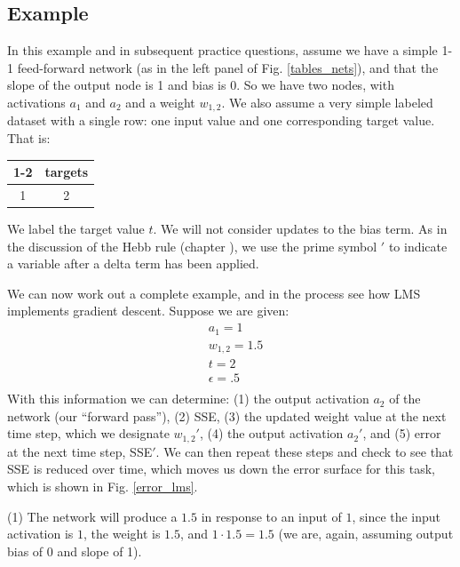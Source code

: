 

\subsection{Example}\label{lms_example}

In this example and in subsequent practice questions, assume we have a  simple 1-1 feed-forward network  (as in the left panel of Fig. \ref{tables_nets}), and that the slope of the output node is 1 and bias is 0. So we have two nodes, with activations $a_1$ and $a_2$ and a weight $w_{1,2}$. We also assume a very simple labeled dataset with a single row: one input value and one corresponding target value. That is:
\begin{center}
\begin{tabular}{| c || c | }
\cline{1-2}
\multicolumn{1}{| c || }{inputs}
 & \multicolumn{1}{c|}{targets} \\
\hline
  1 & 2  \\
\hline
\end{tabular}
\end{center}
We label the target value $t$. We will not consider updates to the bias term. As in the discussion of the Hebb rule (chapter ), we use the prime symbol $'$ to indicate a variable after a delta term has been applied.

We can now work out a complete example, and in the process see how LMS implements gradient descent. Suppose we are given:
\begin{eqnarray*}
& a_1 = 1 \\
& w_{1,2} = 1.5 \\
& t = 2  \\
& \epsilon = .5  \\
\end{eqnarray*}
With this information we can determine: (1) the output activation $a_2$ of the network (our ``forward pass''), (2) SSE, (3) the updated weight value at the next time step, which we designate $w_{1,2}'$, (4) the output activation $a_2'$, and (5) error at the next time step, SSE$'$. We can then repeat these steps and check to see that SSE is reduced over time, which moves us down the error surface for this task, which is shown in Fig. \ref{error_lms}.

(1) The network will produce a $1.5$ in response to an input of $1$, since the input activation is $1$, the weight is $1.5$, and $1 \cdot 1.5 = 1.5$ (we are, again, assuming output bias of 0 and slope of 1). 

